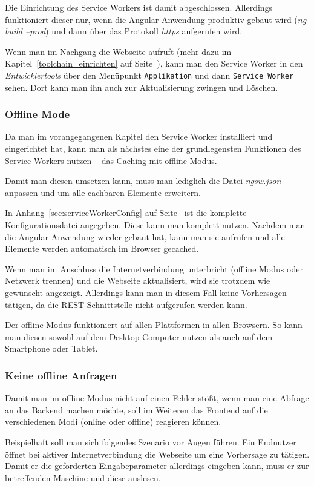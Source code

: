 Die Einrichtung des Service Workers ist damit abgeschlossen. Allerdings funktioniert dieser nur, wenn die
Angular-Anwendung produktiv gebaut wird (\textit{ng build --prod}) und dann über das Protokoll \textit{https} aufgerufen
wird.

Wenn man im Nachgang die Webseite aufruft (mehr dazu im Kapitel~\ref{toolchain_einrichten} auf
Seite~\pageref{toolchain_einrichten}), kann man den Service Worker in den \textit{Entwicklertools} über den Menüpunkt
\texttt{Applikation} und dann \texttt{Service Worker} sehen. Dort kann man ihn auch zur Aktualisierung zwingen und
Löschen.

\subsubsection{Offline Mode}
Da man im vorangegangenen Kapitel den Service Worker installiert und eingerichtet hat, kann man als nächstes eine der
grundlegensten Funktionen des Service Workers nutzen -- das Caching mit offline Modus.

Damit man diesen umsetzen kann, muss man lediglich die Datei \textit{ngsw.json} anpassen und um alle cachbaren Elemente
erweitern.

In Anhang~\ref{sec:serviceWorkerConfig} auf Seite~\pageref{sec:serviceWorkerConfig} ist die komplette
Konfigurationsdatei angegeben. Diese kann man komplett nutzen. Nachdem man die Angular-Anwendung wieder gebaut hat, kann
man sie aufrufen und alle Elemente werden automatisch im Browser gecached.

Wenn man im Anschluss die Internetverbindung unterbricht (offline Modus oder Netzwerk trennen) und die Webseite
aktualisiert, wird sie trotzdem wie gewünscht angezeigt. Allerdings kann man in diesem Fall keine Vorhersagen tätigen,
da die REST-Schnittstelle nicht aufgerufen werden kann.

Der offline Modus funktioniert auf allen Plattformen in allen Browsern. So kann man diesen sowohl auf dem Desktop-Computer
nutzen als auch auf dem Smartphone oder Tablet.

\subsubsection{Keine offline Anfragen}
Damit man im offline Modus nicht auf einen Fehler stößt, wenn man eine Abfrage an das Backend machen möchte, soll im
Weiteren das Frontend auf die verschiedenen Modi (online oder offline) reagieren können.

Beispielhaft soll man sich folgendes Szenario vor Augen führen. Ein Endnutzer öffnet bei aktiver Internetverbindung die
Webseite um eine Vorhersage zu tätigen. Damit er die geforderten Eingabeparameter allerdings eingeben kann, muss er zur
betreffenden Maschine und diese auslesen.

